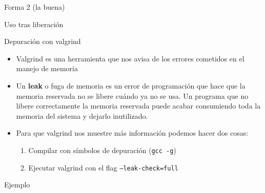 \documentclass{mybeamer}
\begin{document}
\begin{framesubsec}[Forma 2]{Forma 2 (la buena)}
	
\end{framesubsec}

\begin{framesec}{Uso tras liberación}
	
\end{framesec}

\begin{framesec}[valgrind]{Depuración con valgrind}
	\begin{itemize}
		\item Valgrind es una herramienta que nos avisa de los errores
			cometidos en el manejo de memoria
		\item Un \textbf{leak} o fuga de memoria es un error de
			programación que hace que la memoria reservada no se
			libere cuándo ya no se usa. Un programa que no libere
			correctamente la memoria reservada puede acabar
			consumiendo toda la memoria del sistema y dejarlo
			inutilizado.
		\item Para que valgrind nos muestre más información podemos
			hacer dos cosas:
		\begin{enumerate}
			\item Compilar con símbolos de depuración (\texttt{gcc
				-g})
			\item Ejecutar valgrind con el flag
				\texttt{--leak-check=full}
		\end{enumerate}
	\end{itemize}
\end{framesec}

\begin{framesubsec}{Ejemplo}
	\only<1| handout:1>{
		
	}

\end{framesubsec}

\end{document}
